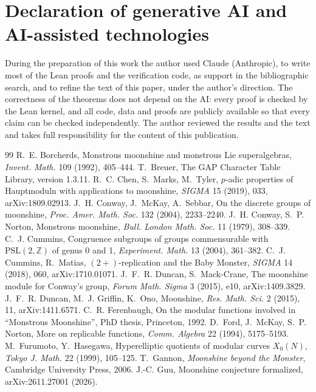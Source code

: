 \documentclass[11pt]{amsart}
\theoremstyle{definition}
\begin{document}
\section*{Declaration of generative AI and AI-assisted technologies}
During the preparation of this work the author used Claude (Anthropic), to write most of the Lean proofs and the verification code, as support in the bibliographic search, and to refine the text of this paper, under the author's direction. The correctness of the theorems does not depend on the AI: every proof is checked by the Lean kernel, and all code, data and proofs are publicly available so that every claim can be checked independently. The author reviewed the results and the text and takes full responsibility for the content of this publication.

\begin{thebibliography}{99}
 R.~E. Borcherds, Monstrous moonshine and monstrous Lie superalgebras, \emph{Invent. Math.} 109 (1992), 405--444.
 T.~Breuer, The GAP Character Table Library, version 1.3.11.
 R.~C. Chen, S.~Marks, M.~Tyler, $p$-adic properties of Hauptmoduln with applications to moonshine, \emph{SIGMA} 15 (2019), 033, arXiv:1809.02913.
 J.~H. Conway, J.~McKay, A.~Sebbar, On the discrete groups of moonshine, \emph{Proc. Amer. Math. Soc.} 132 (2004), 2233--2240.
 J.~H. Conway, S.~P. Norton, Monstrous moonshine, \emph{Bull. London Math. Soc.} 11 (1979), 308--339.
 C.~J. Cummins, Congruence subgroups of groups commensurable with $\mathrm{PSL}(2,\mathbb{Z})$ of genus 0 and 1, \emph{Experiment. Math.} 13 (2004), 361--382.
 C.~J. Cummins, R.~Matias, $(2+)$-replication and the Baby Monster, \emph{SIGMA} 14 (2018), 060, arXiv:1710.01071.
 J.~F.~R. Duncan, S.~Mack-Crane, The moonshine module for Conway's group, \emph{Forum Math. Sigma} 3 (2015), e10, arXiv:1409.3829.
 J.~F.~R. Duncan, M.~J. Griffin, K.~Ono, Moonshine, \emph{Res. Math. Sci.} 2 (2015), 11, arXiv:1411.6571.
 C.~R. Ferenbaugh, On the modular functions involved in ``Monstrous Moonshine'', PhD thesis, Princeton, 1992.
 D.~Ford, J.~McKay, S.~P. Norton, More on replicable functions, \emph{Comm. Algebra} 22 (1994), 5175--5193.
 M.~Furumoto, Y.~Hasegawa, Hyperelliptic quotients of modular curves $X_0(N)$, \emph{Tokyo J. Math.} 22 (1999), 105--125.
 T.~Gannon, \emph{Moonshine beyond the Monster}, Cambridge University Press, 2006.
 J.-C. Guu, Moonshine conjecture formalized, arXiv:2611.27001 (2026).

\end{thebibliography}
\end{document}
